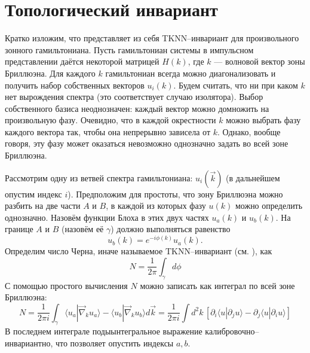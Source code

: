 \section{Топологический инвариант}
Кратко изложим, что представляет из себя TKNN--инвариант для произвольного 
зонного гамильтониана. Пусть гамильтониан системы в импульсном представлении даётся некоторой
матрицей $H(k)$, где $k$ --- волновой вектор зоны Бриллюэна.  
Для каждого $k$ гамильтониан всегда можно диагонализовать
и получить набор собственных векторов $u_i(k)$. Будем считать, что ни при каком $k$ нет 
вырождения спектра (это соответствует случаю изолятора). 
Выбор собственного базиса неоднозначен: каждый вектор
можно домножить на произвольную фазу. Очевидно, что в каждой окрестности $k$ можно выбрать
фазу каждого вектора так, чтобы она непрерывно зависела от $k$. Однако, вообще говоря, 
эту фазу может оказаться невозможно однозначно задать во всей зоне Бриллюэна.

Рассмотрим одну из ветвей спектра гамильтониана: $u_i(\vec{k})$ 
(в дальнейшем опустим индекс $i$). Предположим для простоты, что зону Бриллюэна
можно разбить на две части $A$ и $B$, 
в каждой из которых фазу $u(k)$  можно определить однозначно. 
Назовём функции Блоха в этих двух частях $u_a(k)$ и $u_b(k)$. На границе $A$ и $B$ (назовём
её $\gamma$) должно выполняться равенство
\begin{equation}
   u_b(k) = e^{-i\phi(k)}u_a(k).
\end{equation}
Определим число Черна, иначе называемое $\mathrm{TKNN}$--инвариант 
(см. \cite{Kohmoto1985, Thouless1982}), как
\begin{equation}
    \label{chern_number_definition}
    N = \frac{1}{2\pi}\int_\gamma d\phi
\end{equation}
С помощью простого вычисления %
$N$ можно записать как интеграл по всей зоне Бриллюэна:
\begin{equation}
    N = \frac{1}{2\pi i}\int_\gamma \langle u_a |\vec{\nabla}_k u_a \rangle  - 
                             \langle u_b |\vec{\nabla}_k u_b \rangle d\vec{k} = 
        \frac{1}{2\pi i} 
            \int d^2 k\, \left[\partial_i \langle u | \partial_j u \rangle -
            \partial_j \langle u | \partial_i u \rangle \right]
\end{equation}
В последнем интеграле подыынтегральное выражение калибровочно--инвариантно, что
позволяет опустить индексы $a,b$. 

